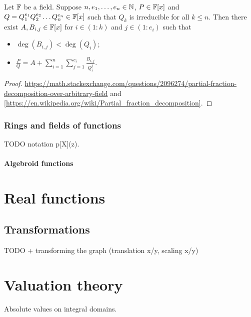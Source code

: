 \begin{proposition} \label{partialFractionDecomposition}
Let $\mathbb{F}$ be a field. Suppose $n,e_1,\ldots, e_n\in \mathbb{N}$, $P\in \mathbb{F}[x]$ and $Q = Q_1^{e_1}Q_2^{e_2}\ldots Q_n^{e_n}\in \mathbb{F}[x]$ such that $Q_k$ is irreducible for all $k\leq n$. Then there exist $A, B_{i,j}\in \mathbb{F}[x]$ for $i\in (1:k)$ and $j\in (1:e_i)$ such that
\begin{itemize}
\item $\deg(B_{i,j}) < \deg(Q_i)$;
\item $\displaystyle\frac{P}{Q} = A + \sum_{i=1}^n\sum_{j=1}^{e_i}\frac{B_{i,j}}{Q_i^j}$.
\end{itemize}
\end{proposition}
\begin{proof}
\url{https://math.stackexchange.com/questions/2096274/partial-fraction-decomposition-over-arbitrary-field} and \ref{https://en.wikipedia.org/wiki/Partial_fraction_decomposition}.
\end{proof}

\subsection{Rings and fields of functions}
TODO notation p[X](z).

\subsubsection{Algebroid functions}

\chapter{Real functions}

\section{Transformations}
TODO + transforming the graph (translation x/y, scaling x/y)



\chapter{Valuation theory}
Absolute values on integral domains.